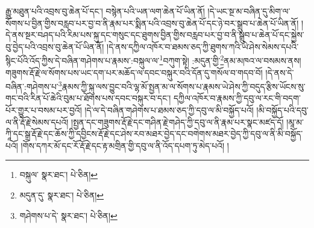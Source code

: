 རྒྱུ་མཐུན་པའི་འབྲས་བུ་ཆེན་པོ་དང་། བསྙེན་པའི་ཡན་ལག་ཆེན་པོ་ཡིན་ནོ། །དེ་ཡང་སྔ་མ་བཞིན་དུ་མིག་ལ་སོགས་པ་བྱིན་གྱིས་བརླབ་པར་བྱ་བ་ནི་རྣམ་པར་སྨིན་པའི་འབྲས་བུ་ཆེན་པོ་དང་ཉེ་བར་སྒྲུབ་པ་ཆེན་པོ་ཡིན་ནོ། །དེ་ནས་སྔར་བཤད་པའི་རིམ་པས་སྐུ་དང་གསུང་དང་ཐུགས་བྱིན་གྱིས་བརླབ་པར་བྱ་བ་ནི་སྒྲུབ་པ་ཆེན་པོ་དང་སྐྱེས་བུ་བྱེད་པའི་འབྲས་བུ་ཆེན་པོ་ཡིན་ནོ། །དེ་ནས་དཀྱིལ་འཁོར་བ་ཐམས་ཅད་ཀྱི་ཐུགས་ཀའི་ཡེ་ཤེས་སེམས་དཔའི་སྙིང་པོའི་འོད་ཀྱིས་དེ་བཞིན་གཤེགས་པ་རྣམས་:བསྐུལ་ལ་\footnote{བསྐུལ་  སྣར་ཐང་།  པེ་ཅིན། }བཀུག་སྟེ། :མདུན་གྱི་\footnote{མདུན་དུ་  སྣར་ཐང་།  པེ་ཅིན། }ནམ་མཁའ་ལ་བསམས་ནས། གཟུགས་རྡོ་རྗེ་ལ་སོགས་པས་ཡང་དག་པར་མཆོད་ལ་དབང་བསྐུར་བའི་དོན་དུ་གསོལ་བ་གདབ་བོ། །དེ་ནས་དེ་བཞིན་:གཤེགས་པ་\footnote{གཤེགས་པ་དེ་  སྣར་ཐང་།  པེ་ཅིན། }རྣམས་ཀྱི་སྐུ་ལས་བྱུང་བའི་ལྷ་མོ་སྤྱན་མ་ལ་སོགས་པ་རྣམས་ཡེ་ཤེས་ཀྱི་བདུད་རྩིས་ཡོངས་སུ་གང་བའི་རིན་པོ་ཆེའི་བུམ་པ་ཐོགས་པས་དབང་བསྐུར་བ་དང་། དཀྱིལ་འཁོར་བ་རྣམས་ཀྱི་དབུ་ལ་རང་གི་བདག་པོར་གྱུར་པ་བསམ་པར་བྱའོ། །དེ་ལ་དེ་བཞིན་གཤེགས་པ་ཐམས་ཅད་ཀྱི་དབུ་ལ་མི་བསྐྱོད་པའོ། །མི་བསྐྱོད་པའི་དབུ་ལ་ནི་རྡོ་རྗེ་སེམས་དཔའོ། །སྤྱན་དང་གཟུགས་རྡོ་རྗེ་དང་གཤིན་རྗེ་གཤེད་ཀྱི་དབུ་ལ་ནི་རྣམ་པར་སྣང་མཛད་དོ། །མཱ་མ་ཀཱི་དང་སྒྲ་རྡོ་རྗེ་དང་ཆོས་ཀྱི་དབྱིངས་རྡོ་རྗེ་དང་ཤེས་རབ་མཐར་བྱེད་དང་བགེགས་མཐར་བྱེད་ཀྱི་དབུ་ལ་ནི་མི་བསྐྱོད་པའོ། །གོས་དཀར་མོ་དང་རོ་རྡོ་རྗེ་དང་རྟ་མགྲིན་གྱི་དབུ་ལ་ནི་འོད་དཔག་ཏུ་མེད་པའོ། །
